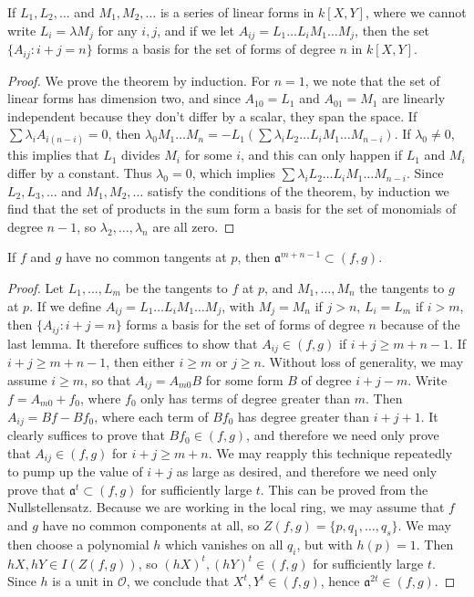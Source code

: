 \begin{lemma}
    If $L_1, L_2, \dots$ and $M_1, M_2, \dots$ is a series of linear forms in $k[X,Y]$, where we cannot write $L_i = \lambda M_j$ for any $i,j$, and if we let $A_{ij} = L_1 \dots L_i M_1 \dots M_j$, then the set $\{ A_{ij} : i + j = n \}$ forms a basis for the set of forms of degree $n$ in $k[X,Y]$.
\end{lemma}
\begin{proof}
    We prove the theorem by induction. For $n = 1$, we note that the set of linear forms has dimension two, and since $A_{10} = L_1$ and $A_{01} = M_1$ are linearly independent because they don't differ by a scalar, they span the space. If $\sum \lambda_i A_{i(n-i)} = 0$, then $\lambda_0 M_1 \dots M_n = -L_1(\sum \lambda_i L_2 \dots L_i M_1 \dots M_{n-i})$. If $\lambda_0 \neq 0$, this implies that $L_1$ divides $M_i$ for some $i$, and this can only happen if $L_1$ and $M_i$ differ by a constant. Thus $\lambda_0 = 0$, which implies $\sum \lambda_i L_2 \dots L_i M_1 \dots M_{n-i}$. Since $L_2, L_3, \dots$ and $M_1, M_2, \dots$ satisfy the conditions of the theorem, by induction we find that the set of products in the sum form a basis for the set of monomials of degree $n-1$, so $\lambda_2, \dots, \lambda_n$ are all zero.
\end{proof}

\begin{lemma}
    If $f$ and $g$ have no common tangents at $p$, then $\mathfrak{a}^{m+n-1} \subset (f,g)$.
\end{lemma}
\begin{proof}
    Let $L_1, \dots, L_m$ be the tangents to $f$ at $p$, and $M_1, \dots, M_n$ the tangents to $g$ at $p$. If we define $A_{ij} = L_1 \dots L_i M_1 \dots M_j$, with $M_j = M_n$ if $j > n$, $L_i = L_m$ if $i > m$, then $\{ A_{ij}: i + j = n \}$ forms a basis for the set of forms of degree $n$ because of the last lemma. It therefore suffices to show that $A_{ij} \in (f,g)$ if $i + j \geq m + n - 1$. If $i + j \geq m + n - 1$, then either $i \geq m$ or $j \geq n$. Without loss of generality, we may assume $i \geq m$, so that $A_{ij} = A_{m0}B$ for some form $B$ of degree $i + j - m$. Write $f = A_{m0} + f_0$, where $f_0$ only has terms of degree greater than $m$. Then $A_{ij} = Bf - Bf_0$, where each term of $Bf_0$ has degree greater than $i + j + 1$. It clearly suffices to prove that $Bf_0 \in (f,g)$, and therefore we need only prove that $A_{ij} \in (f,g)$ for $i + j \geq m + n$. We may reapply this technique repeatedly to pump up the value of $i + j$ as large as desired, and therefore we need only prove that $\mathfrak{a}^t \subset (f,g)$ for sufficiently large $t$. This can be proved from the Nullstellensatz. Because we are working in the local ring, we may assume that $f$ and $g$ have no common components at all, so $Z(f,g) = \{ p, q_1, \dots, q_s \}$. We may then choose a polynomial $h$ which vanishes on all $q_i$, but with $h(p) = 1$. Then $hX, hY \in I(Z(f,g))$, so $(hX)^t, (hY)^t \in (f,g)$ for sufficiently large $t$. Since $h$ is a unit in $\mathcal{O}$, we conclude that $X^t, Y^t \in (f,g)$, hence $\mathfrak{a}^{2t} \in (f,g)$.
\end{proof}

